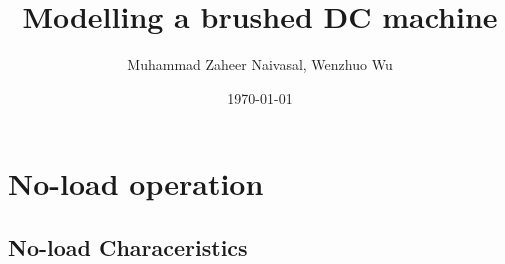 \documentclass[a4paper]{article}
\begin{document}
\title{\bfseries Modelling a brushed DC machine}
\author{Muhammad Zaheer Naivasal, Wenzhuo Wu}
\date{\today}
\maketitle

\section{No-load operation}
\subsection{No-load Characeristics}
\end{document}
